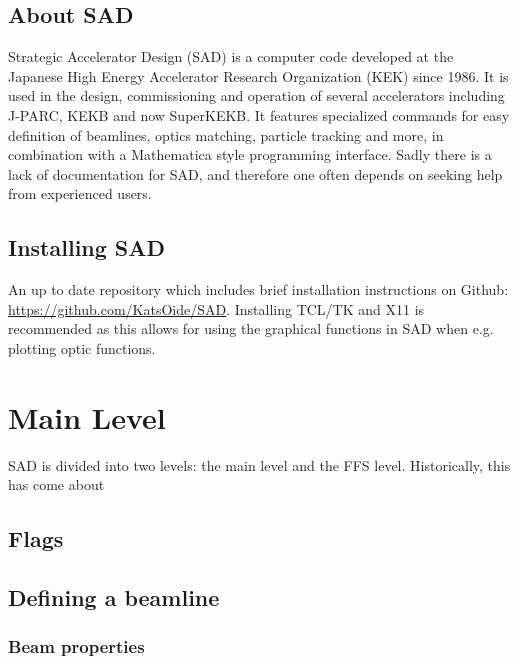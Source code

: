 \documentclass{article}
\begin{document}
\subsection{About SAD}
Strategic Accelerator Design (SAD) is a computer code developed at the Japanese High Energy Accelerator Research Organization (KEK) since 1986. It is used in the design, commissioning and operation of several accelerators including J-PARC, KEKB and now SuperKEKB. It features specialized commands for easy definition of beamlines, optics matching, particle tracking and more, in combination with a Mathematica style programming interface.
Sadly there is a lack of documentation for SAD, and therefore one often depends on seeking help from experienced users.

\subsection{Installing SAD}
An up to date repository which includes brief installation instructions on Github: \url{https://github.com/KatsOide/SAD}.
Installing TCL/TK and X11 is recommended as this allows for using the graphical functions in SAD when e.g. plotting optic functions.

\clearpage


\section{Main Level}
SAD is divided into two levels: the main level and the FFS level. Historically, this has come about 

\subsection{Flags}


\subsection{Defining a beamline}

\subsubsection{Beam properties}
\end{document}
